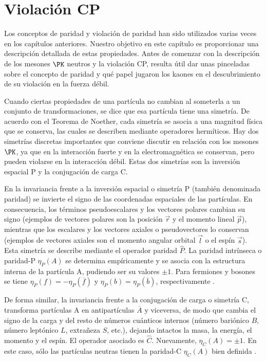 \chapter{Violación CP}\label{cap:CP_violation}
Los conceptos de paridad y violación de paridad han sido utilizados varias veces en los capítulos anteriores. Nuestro objetivo en este capítulo es proporcionar una descripción detallada de estas propiedades. Antes de comenzar con la descripción de los mesones $\PK$ neutros y la violación CP, resulta útil dar unas pinceladas sobre el concepto de paridad y qué papel jugaron los kaones en el descubrimiento de su violación en la fuerza débil. 

Cuando ciertas propiedades de una partícula no cambian al someterla a un conjunto de transformaciones, se dice que esa partícula tiene una simetría. De acuerdo con el Teorema de Noether, cada simetría se asocia a una magnitud física que se conserva, las cuales se describen mediante operadores hermíticos. Hay dos simetrías discretas importantes que conviene discutir en relación con los mesones $\PK$, ya que en la interacción fuerte y en la
electromagnética se conservan, pero pueden violarse en la interacción débil. Estas dos simetrías son la inversión espacial P y la conjugación de carga C.

En la invariancia frente a la inversión espacial o simetría P (también denominada paridad) se invierte el signo de las coordenadas espaciales de las partículas. En consecuencia, los términos pseudoescalares y los vectores polares cambian su signo (ejemplos de vectores polares son la posición $\vec{r}$ y el momento lineal $\vec{p}$), mientras que los escalares y los vectores axiales o pseudovectores lo conservan (ejemplos de vectores axiales son el momento angular orbital $\vec{l}$ o el espín $\vec{s}$). Esta simetría se describe mediante el operador paridad $\hat{P}$. La paridad intrínseca o paridad-P $\eta _{P}\left(A \right)$ se determina empíricamente y se asocia con la estructura interna de la partícula A, pudiendo ser su valores $\pm 1$. Para fermiones y bosones se tiene $\eta _{P}\left(f \right)= -\eta_{P} \left(\overline{f} \right)$ y $\eta_{P}\left(b \right)=\eta_{P}\left(\overline{b}\right)$, respectivamente \cite{notas2020}. 

De forma similar, la invariancia frente a la conjugación de carga o simetría C, transforma partículas A en antipartículas $\overline{A}$ y viceversa, de modo que cambia el signo de la carga y del resto de números cuánticos internos (número bariónico $B$, número leptónico $L$, extrañeza $S$, etc.), dejando intactos la masa, la energía, el momento y el espín.  El operador asociado es $\hat{C}$. Nuevamente, $\eta _{C}\left(A\right)= \pm 1$. En este caso, sólo las partículas neutras tienen la paridad-C  $\eta _{C}\left(A \right)$ bien definida \cite{notas2020}. 

